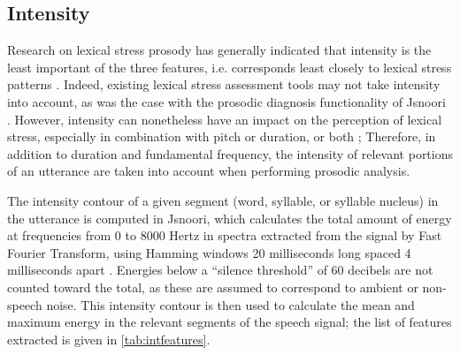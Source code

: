 	\subsection{Intensity}
	\label{sec:prosody:intensity}
	
		
		Research on lexical stress prosody has generally indicated that intensity is the least important of the three features, i.e. corresponds least closely to lexical stress patterns \citep{Cutler2005}. 
Indeed, existing lexical stress assessment tools may not take intensity into account, as 
was the case with the prosodic diagnosis functionality of Jsnoori .
However, intensity can nonetheless have an impact on the perception of lexical stress, especially in combination with pitch or duration, or both \citep{Cutler2005}; %
Therefore, in addition to duration and fundamental frequency, the intensity of relevant portions of an utterance are taken into account when performing prosodic analysis.




	The intensity contour of a given segment (word, syllable, or syllable nucleus) in the utterance is computed in Jsnoori, which calculates the total amount of energy at frequencies from 0 to 8000 Hertz in spectra extracted from the signal by Fast Fourier Transform, using Hamming windows 20 milliseconds long spaced 4 milliseconds apart . Energies below a ``silence threshold'' of 60 decibels are not counted toward the total, as these are assumed to correspond to ambient or non-speech noise.  
	This intensity contour is then used to calculate the mean and maximum energy in the relevant segments of the speech signal; the list of features extracted is given in \cref{tab:intfeatures}.
	
	
	
